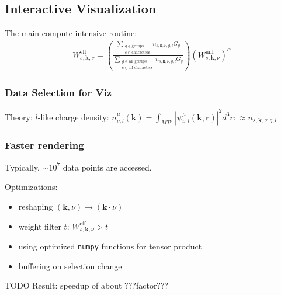 \documentclass{beamer}
\begin{document}
\subsection{Interactive Visualization}
\label{sec:visualization}

\begin{frame}    
    The main compute-intensive routine:
    \begin{align*}
      W^{\text{eff}}_{s,\mathbf{k},\nu} = \left( \frac{\sum\limits_{\substack{g \in \text{groups} \\ c \in \text{characters}}} n_{s,\mathbf{k},\nu,g,l} G_g}{\sum\limits_{\substack{g \in \text{all groups} \\ c \in \text{all characters}}} n_{s,\mathbf{k},\nu,g,l} G_g} \right) \left(W_{s,\mathbf{k},\nu}^{\text{unf}}\right)^\alpha
    \end{align*}
    \vspace{3em}

        \frametitle{Data Selection for Viz}
    Theory: \(l\)-like charge density: \(n_{\nu,l}^\mu(\mathbf{k}) = \int_{MT^\mu} |\psi_{\nu,l}^\mu(\mathbf{k,r})|^2 d^3r :\approx n_{s,\mathbf{k},\nu,g,l}\)     
\end{frame}
% 

\begin{frame}
    \frametitle{Faster rendering}
    Typically, \(\sim 10^7\) data points are accessed.
    \vspace{2em}


    
    Optimizations:
    \begin{itemize}
    \item reshaping \((\mathbf{k},\nu) \rightarrow (\mathbf{k} \cdot \nu)\)
    \item weight filter \(t\): \(W^{\text{eff}}_{s,\mathbf{k},\nu} > t\)
    \item using optimized \texttt{numpy} functions for tensor product 
    \item buffering on selection change
    \end{itemize}
    TODO \faArrowRight{} Result: speedup of about ???factor??? 
\end{frame}
\end{document}
